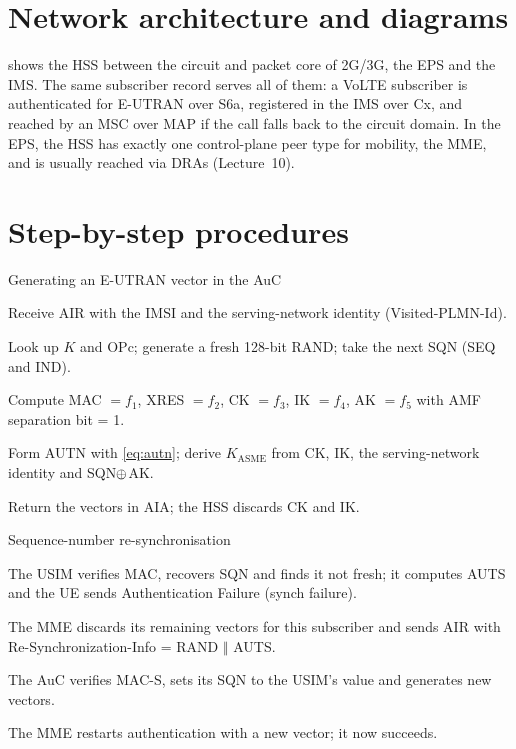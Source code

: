 \documentclass[11pt,a4paper]{article}
\begin{document}
\section{Network architecture and diagrams}
 shows the HSS between the circuit and packet core of 2G/3G, the EPS and the IMS. The
same subscriber record serves all of them: a VoLTE subscriber is authenticated for E-UTRAN over S6a,
registered in the IMS over Cx, and reached by an MSC over MAP if the call falls back to the circuit
domain. In the EPS, the HSS has exactly one control-plane peer type for mobility, the MME, and is
usually reached via DRAs (Lecture~10).

\section{Step-by-step procedures}

\begin{procedurebox}{Generating an E-UTRAN vector in the AuC}\label{proc:av}
\begin{steps}
  \item Receive AIR with the IMSI and the serving-network identity (Visited-PLMN-Id).
  \item Look up $K$ and OPc; generate a fresh 128-bit RAND; take the next SQN (SEQ and IND).
  \item Compute MAC $= f_1$, XRES $= f_2$, CK $= f_3$, IK $= f_4$, AK $= f_5$ with AMF separation bit = 1.
  \item Form AUTN with \cref{eq:autn}; derive $K_{\mathrm{ASME}}$ from CK, IK, the serving-network identity
        and SQN$\oplus$AK.
  \item Return the vectors in AIA; the HSS discards CK and IK.
\end{steps}
\end{procedurebox}

\begin{procedurebox}{Sequence-number re-synchronisation}\label{proc:resync}
\begin{steps}
  \item The USIM verifies MAC, recovers SQN and finds it not fresh; it computes AUTS and the UE sends
        Authentication Failure (synch failure).
  \item The MME discards its remaining vectors for this subscriber and sends AIR with
        Re-Synchronization-Info = RAND $\Vert$ AUTS.
  \item The AuC verifies MAC-S, sets its SQN to the USIM's value and generates new vectors.
  \item The MME restarts authentication with a new vector; it now succeeds.
\end{steps}
\end{procedurebox}
\end{document}
